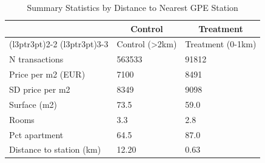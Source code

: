 \begin{table}[!h]
\centering
\caption{\label{tab:tab:summary}Summary Statistics by Distance to Nearest GPE Station}
\centering
\begin{tabular}[t]{lll}
\toprule
\multicolumn{1}{c}{ } & \multicolumn{1}{c}{Control} & \multicolumn{1}{c}{Treatment} \\
\cmidrule(l{3pt}r{3pt}){2-2} \cmidrule(l{3pt}r{3pt}){3-3}
  & Control (>2km) & Treatment (0-1km)\\
\midrule
N transactions & 563533 & 91812\\
Price per m2 (EUR) & 7100 & 8491\\
SD price per m2 & 8349 & 9098\\
Surface (m2) & 73.5 & 59.0\\
Rooms & 3.3 & 2.8\\
\addlinespace
Pct apartment & 64.5 & 87.0\\
Distance to station (km) & 12.20 & 0.63\\
\bottomrule
\end{tabular}
\end{table}
